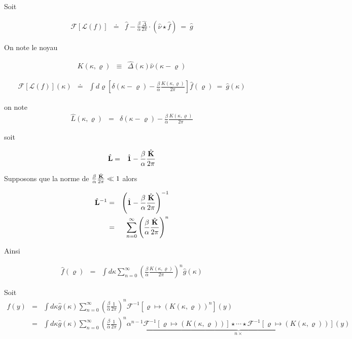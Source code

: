 Soit 

\begin{eqnarray*}
	\mathcal{F} [\mathcal{L} ( f )] & \doteq & \hat{f} - \frac{\beta}{\alpha} \frac{\hat{\Delta}}{2 \pi} \cdot ( \hat{\nu} \star \hat{f} ) ~= ~ \hat{g} 	
\end{eqnarray*}

On note le noyau 

\begin{eqnarray*}
	K ( \kappa , \varrho ) & \equiv  & \hat{\Delta}(\kappa) \hat{\nu} ( \kappa - \varrho ) 		
\end{eqnarray*}

\begin{eqnarray*}
	\mathcal{F} [\mathcal{L} ( f )](\kappa)  & \doteq & \int d \varrho \left [ \delta( \kappa - \varrho ) - \frac{\beta}{\alpha} \frac{K( \kappa , \varrho)}{ 2 \pi } \right ] \hat{f}(\varrho)  ~= ~ \hat{g}(\kappa) 	
\end{eqnarray*}

on note  
\begin{eqnarray*}
	\hat{L} ( \kappa , \varrho )  & = & \delta( \kappa - \varrho ) - \frac{\beta}{\alpha} \frac{K( \kappa , \varrho)}{ 2 \pi }	
\end{eqnarray*}

soit 

\begin{eqnarray*}
	\hat{\mathbf{L}}   & = & \hat{\mathbf{1}} - \frac{\beta}{\alpha} \frac{\hat{\mathbf{K}}}{ 2 \pi }	
\end{eqnarray*}

Supposons que la norme de $\frac{\beta}{\alpha} \frac{\hat{\mathbf{K}}}{ 2 \pi } \ll 1  $ alors 

\begin{eqnarray*}
	\hat{\mathbf{L}}^{-1}   & = &  \left ( \hat{\mathbf{1}} - \frac{\beta}{\alpha} \frac{\hat{\mathbf{K}}}{ 2 \pi }	 \right )^{-1} \\
	& = & \sum_{n =0 }^{\infty} \left ( \frac{\beta}{\alpha} \frac{\hat{\mathbf{K}}}{ 2 \pi } \right )^{n} 	
\end{eqnarray*}

Ainsi 

\begin{eqnarray*}
	\hat{f}(\varrho) & = & \int d \kappa \sum_{n =0 }^{\infty} \left ( \frac{\beta}{\alpha} \frac{K ( \kappa , \varrho ) }{ 2 \pi } \right )^{n} \hat{g} ( \kappa ) 	
\end{eqnarray*}

Soit 
\begin{eqnarray*}
	f(y) & = & \int d \kappa\hat{g}( \kappa ) \sum_{n =0 }^{\infty} \left ( \frac{\beta}{\alpha} \frac{1 }{ 2 \pi } \right )^{n} \mathcal{F}^{-1} [ \varrho \mapsto (K ( \kappa , \varrho ))^n](y)\\
	& = & \int d \kappa\hat{g}( \kappa ) \sum_{n =0 }^{\infty} \left ( \frac{\beta}{\alpha} \frac{1 }{ 2 \pi } \right )^{n} \alpha^{n-1} \underbrace{\mathcal{F}^{-1} [ \varrho \mapsto (K ( \kappa , \varrho ))]\star \cdots \star \mathcal{F}^{-1} [ \varrho \mapsto (K ( \kappa , \varrho ))]}_{n \times}  (y)  	
\end{eqnarray*}

